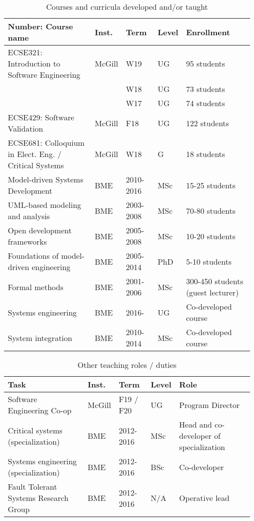 \begin{table}[htb]
\footnotesize
\begin{tabular}{@{}p{8cm}lllp{4cm}@{}}
\toprule
\textbf{Number: Course name} & \textbf{Inst.} & \textbf{Term} & \textbf{Level} & \textbf{Enrollment} \\ \midrule
ECSE321: Introduction to Software Engineering & McGill & W19& UG & 95 students \\
 &  & W18 & UG & 73 students \\
 &  & W17 & UG & 74 students \\ \midrule
ECSE429: Software Validation & McGill & F18& UG & 122 students \\ \midrule
ECSE681: Colloquium in Elect. Eng. / Critical Systems & McGill & W18& G & 18 students \\ \midrule
Model-driven Systems Development  & BME & 2010-2016 & MSc & 15-25 students \\
UML-based modeling and analysis  & BME & 2003-2008 & MSc & 70-80 students \\
Open development frameworks & BME & 2005-2008 & MSc & 10-20 students \\
Foundations of model-driven engineering & BME & 2005-2014 & PhD & 5-10 students \\
Formal methods & BME & 2001-2006 & MSc & 300-450 students \newline (guest lecturer) \\
Systems engineering & BME & 2016- & UG & Co-developed course\\
System integration & BME & 2010-2014 & MSc & Co-developed course\\
\bottomrule
\end{tabular}
\caption{Courses and curricula developed and/or taught}
\label{tab:courses-taught}
\end{table}

\begin{table}[htb]
\footnotesize
\begin{tabular}{@{}p{6cm}lllp{6cm}@{}}
\toprule
\textbf{Task} & \textbf{Inst.} & \textbf{Term} & \textbf{Level} & \textbf{Role} \\ \midrule
Software Engineering Co-op & McGill & F19 / F20 & UG & Program Director\\ 
Critical systems (specialization) & BME & 2012-2016 & MSc & Head and co-developer of specialization \\
Systems engineering (specialization) & BME & 2012-2016 & BSc & Co-developer \\
Fault Tolerant Systems Research Group & BME & 2012-2016 & N/A & Operative lead \\
\bottomrule
\end{tabular}
\caption{Other teaching roles / duties}
\label{tab:other-teaching}
\end{table}

